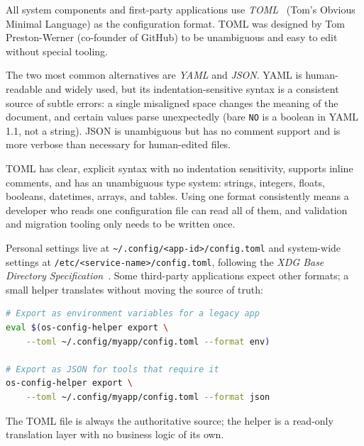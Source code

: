 All system components and first-party applications use
\emph{TOML}~\cite{toml} (Tom's Obvious Minimal Language) as
the configuration format. TOML was designed by Tom Preston-Werner (co-founder of
GitHub) to be unambiguous and easy to edit without special tooling.

The two most common alternatives are \emph{YAML} and \emph{JSON}. YAML is
human-readable and widely used, but its indentation-sensitive syntax is a
consistent source of subtle errors: a single misaligned space changes the meaning
of the document, and certain values parse unexpectedly (bare \texttt{NO} is a
boolean in YAML 1.1, not a string). JSON is unambiguous but has no comment
support and is more verbose than necessary for human-edited files.

TOML has clear, explicit syntax with no indentation sensitivity, supports inline
comments, and has an unambiguous type system: strings, integers, floats,
booleans, datetimes, arrays, and tables. Using one format consistently means a
developer who reads one configuration file can read all of them, and validation
and migration tooling only needs to be written once.

Personal settings live at
\texttt{\textasciitilde/.config/<app-id>/config.toml} and system-wide settings
at \texttt{/etc/<service-name>/config.toml}, following the
\emph{XDG Base Directory Specification}~\cite{xdg:basedir}. Some third-party applications expect other formats; a
small helper translates without moving the source of truth:

\begin{lstlisting}[language=bash]
# Export as environment variables for a legacy app
eval $(os-config-helper export \
    --toml ~/.config/myapp/config.toml --format env)

# Export as JSON for tools that require it
os-config-helper export \
    --toml ~/.config/myapp/config.toml --format json
\end{lstlisting}

The TOML file is always the authoritative source; the helper is a read-only
translation layer with no business logic of its own.
